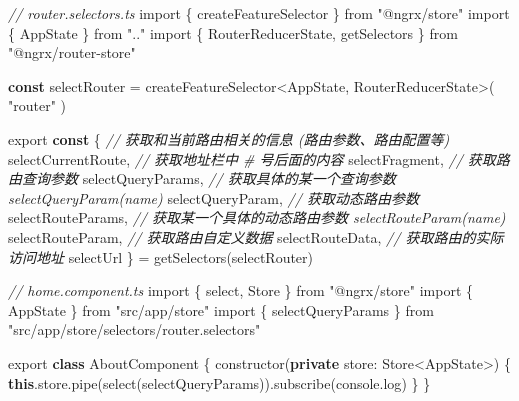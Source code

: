 \documentclass[
]{article}
\newenvironment{Shaded}{}{}
\newcommand{\AttributeTok}[1]{\textcolor[rgb]{0.49,0.56,0.16}{#1}}
\newcommand{\BuiltInTok}[1]{#1}
\newcommand{\CommentTok}[1]{\textcolor[rgb]{0.38,0.63,0.69}{\textit{#1}}}
\newcommand{\DataTypeTok}[1]{\textcolor[rgb]{0.56,0.13,0.00}{#1}}
\newcommand{\FunctionTok}[1]{\textcolor[rgb]{0.02,0.16,0.49}{#1}}
\newcommand{\ImportTok}[1]{#1}
\newcommand{\KeywordTok}[1]{\textcolor[rgb]{0.00,0.44,0.13}{\textbf{#1}}}
\newcommand{\NormalTok}[1]{#1}
\newcommand{\OperatorTok}[1]{\textcolor[rgb]{0.40,0.40,0.40}{#1}}
\newcommand{\StringTok}[1]{\textcolor[rgb]{0.25,0.44,0.63}{#1}}
\begin{document}
\begin{Shaded}
\begin{Highlighting}[]
\CommentTok{// router.selectors.ts}
\ImportTok{import}\NormalTok{ \{ createFeatureSelector \} }\ImportTok{from} \StringTok{"@ngrx/store"}
\ImportTok{import}\NormalTok{ \{ AppState \} }\ImportTok{from} \StringTok{".."}
\ImportTok{import}\NormalTok{ \{ RouterReducerState}\OperatorTok{,}\NormalTok{ getSelectors \} }\ImportTok{from} \StringTok{"@ngrx/router{-}store"}

\KeywordTok{const}\NormalTok{ selectRouter }\OperatorTok{=}\NormalTok{ createFeatureSelector}\OperatorTok{\textless{}}\NormalTok{AppState}\OperatorTok{,}\NormalTok{ RouterReducerState}\OperatorTok{\textgreater{}}\NormalTok{(}
  \StringTok{"router"}
\NormalTok{)}

\ImportTok{export} \KeywordTok{const}\NormalTok{ \{}
  \CommentTok{// 获取和当前路由相关的信息 (路由参数、路由配置等)}
\NormalTok{  selectCurrentRoute}\OperatorTok{,}
  \CommentTok{// 获取地址栏中 \# 号后面的内容}
\NormalTok{  selectFragment}\OperatorTok{,}
  \CommentTok{// 获取路由查询参数}
\NormalTok{  selectQueryParams}\OperatorTok{,}
  \CommentTok{// 获取具体的某一个查询参数 selectQueryParam(\textquotesingle{}name\textquotesingle{})}
\NormalTok{  selectQueryParam}\OperatorTok{,}
  \CommentTok{// 获取动态路由参数}
\NormalTok{  selectRouteParams}\OperatorTok{,}
 	\CommentTok{// 获取某一个具体的动态路由参数 selectRouteParam(\textquotesingle{}name\textquotesingle{})}
\NormalTok{  selectRouteParam}\OperatorTok{,}
  \CommentTok{// 获取路由自定义数据}
\NormalTok{  selectRouteData}\OperatorTok{,}
  \CommentTok{// 获取路由的实际访问地址}
\NormalTok{  selectUrl}
\NormalTok{\} }\OperatorTok{=} \FunctionTok{getSelectors}\NormalTok{(selectRouter)}
\end{Highlighting}
\end{Shaded}

\begin{Shaded}
\begin{Highlighting}[]
\CommentTok{// home.component.ts}
\ImportTok{import}\NormalTok{ \{ select}\OperatorTok{,}\NormalTok{ Store \} }\ImportTok{from} \StringTok{"@ngrx/store"}
\ImportTok{import}\NormalTok{ \{ AppState \} }\ImportTok{from} \StringTok{"src/app/store"}
\ImportTok{import}\NormalTok{ \{ selectQueryParams \} }\ImportTok{from} \StringTok{"src/app/store/selectors/router.selectors"}

\ImportTok{export} \KeywordTok{class}\NormalTok{ AboutComponent \{}
  \FunctionTok{constructor}\NormalTok{(}\KeywordTok{private} \DataTypeTok{store}\OperatorTok{:}\NormalTok{ Store}\OperatorTok{\textless{}}\NormalTok{AppState}\OperatorTok{\textgreater{}}\NormalTok{) \{}
    \KeywordTok{this}\OperatorTok{.}\AttributeTok{store}\OperatorTok{.}\FunctionTok{pipe}\NormalTok{(}\FunctionTok{select}\NormalTok{(selectQueryParams))}\OperatorTok{.}\FunctionTok{subscribe}\NormalTok{(}\BuiltInTok{console}\OperatorTok{.}\FunctionTok{log}\NormalTok{)}
\NormalTok{  \}}
\NormalTok{\}}
\end{Highlighting}
\end{Shaded}
\end{document}
